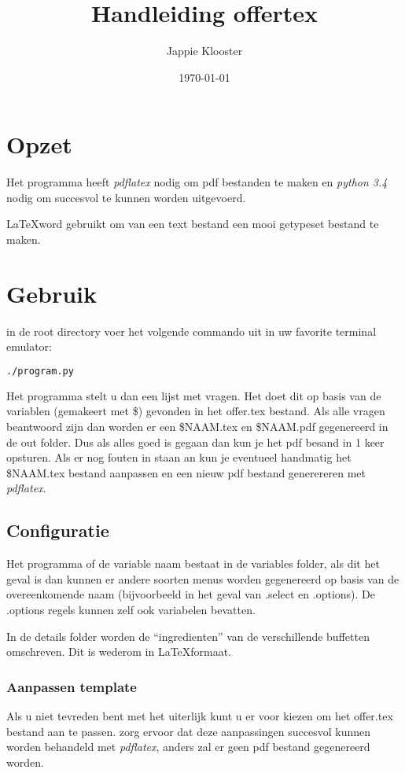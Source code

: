 \documentclass{scrartcl}
\begin{document}
\title{Handleiding offertex}
\date{\today}
\author{Jappie Klooster}
\maketitle
\section{Opzet}
Het programma heeft \emph{pdflatex} nodig om pdf bestanden te maken en
\emph{python 3.4} nodig om succesvol te kunnen worden uitgevoerd.

\LaTeX word gebruikt om van een text bestand een mooi getypeset bestand
te maken.

\section{Gebruik}
in de root directory voer het volgende commando uit in uw favorite terminal
emulator:
\begin{lstlisting}[language=bash]
	./program.py
\end{lstlisting}

Het programma stelt u dan een lijst met vragen. Het doet dit op basis
van de variablen (gemakeert met \$) gevonden in het offer.tex bestand.
Als alle vragen beantwoord zijn dan worden er een \$NAAM.tex en \$NAAM.pdf
gegenereerd in de out folder. Dus als alles goed is gegaan dan kun je
het pdf besand in 1 keer opsturen. Als er nog fouten in staan an
kun je eventueel handmatig het \$NAAM.tex bestand aanpassen en een
nieuw pdf bestand generereren met \emph{pdflatex}.

\subsection{Configuratie}
Het programma of de variable naam bestaat in de variables
folder, als dit het geval is dan kunnen er andere soorten menus worden
gegenereerd op basis van de overeenkomende naam (bijvoorbeeld in het
geval van .select en .options). De .options regels kunnen zelf ook variabelen
bevatten.

In de details folder worden de ``ingredienten'' van de verschillende buffetten 
omschreven. Dit is wederom in \LaTeX formaat.

\subsubsection{Aanpassen template}
Als u niet tevreden bent met het uiterlijk kunt u er voor
kiezen om het offer.tex bestand aan te passen. zorg ervoor dat
deze aanpassingen succesvol kunnen worden behandeld met \emph{pdflatex},
anders zal er geen pdf bestand gegenereerd worden.
\end{document}
